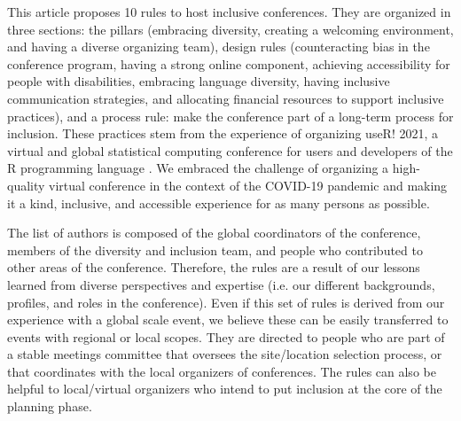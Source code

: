 \documentclass[10pt,letterpaper]{article}
\begin{document}
This article proposes 10 rules to host inclusive conferences.
They are organized in three sections: the pillars (embracing diversity, creating a welcoming environment, and having a diverse organizing team), design rules (counteracting bias in the conference program, having a strong online component, achieving accessibility for people with disabilities, embracing language diversity, having inclusive communication strategies, and allocating financial resources to support inclusive practices), and a process rule: make the conference part of a long-term process for inclusion. 
These practices stem from the experience of organizing useR! 2021, a virtual and global statistical computing conference for users and developers of the R programming language \cite{r_core_team_2021}. 
We embraced the challenge of organizing a high-quality virtual conference in the context of the COVID-19 pandemic and making it a kind, inclusive, and accessible experience for as many persons as possible.

The list of authors is composed of the global coordinators of the conference, members of the diversity and inclusion team, and people who contributed to other areas of the conference. 
Therefore, the rules are a result of our lessons learned from diverse perspectives and expertise (i.e. our different backgrounds, profiles, and roles in the conference). 
Even if this set of rules is derived from our experience with a global scale event, we believe these can be easily transferred to events with regional or local scopes.
They are directed to people who are part of a stable meetings committee that oversees the site/location selection process, or that coordinates with the local organizers of conferences.
The rules can also be helpful to local/virtual organizers who intend to put inclusion at the core of the planning phase.

\end{document}
